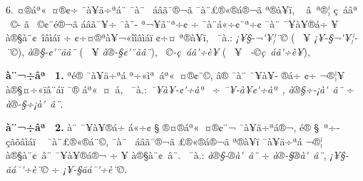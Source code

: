 \documentclass[12pt,twoside,a4paper]{article}
\newenvironment{prym}
               {\list{}{\leftmargin1.7\parindent
                        \listparindent\parindent
                        \itemindent\parindent
                        \parsep0.5ex\topsep1ex   
               }%
                        \footnotesize
                        \item\relax}
               {\endlist}
\begin{document}
6. ^^8e^^a4^^ad^^ae^^e1^^aa^^ab^^a0^^a4^^ae^^a2^^f7 ^^af^^e0^^a5^^e4^^f7^^aa^^e1^^a8 ^^af^^e0^^a8 ^^ad^^a0^^e1^^e2^^e3^^af^^ad^^ae^^ac^^e3 ^^af^^e0^^a8^^a3^^ae^^ab^^ae^^e1^^ad^^ae^^ac^^e3 \linebreak
 ^^aa^^ae^^e0^^a5^^ad^^ef, ^^a0 ^^e2^^a0^^aa^^ae^^a6 ^^e7^^a0^^e1^^e2^^aa^^a0 ^^ad^^a0^^a9- ^^e3 ^^ad^^a0^^a9^^a2^^a8^^e9^^ae^^ac^^e3 ^^e1^^e2^^e3^^af^^a5^^ad^^f7 ^^af^^e0^^a8-\linebreak
^^aa^^ac^^a5^^e2^^ad^^a8^^aa^^f7^^a2 ^^f7 ^^af^^e0^^a8^^e1^^ab^^f7^^a2^^ad^^a8^^aa^^f7^^a2 ^^af^^e0^^a8 ^^af^^a5^^e0^^a5^^ad^^ae^^e1^^f7 ^^ad^^a5 ^^e0^^ae^^a7^^e0^^a8^^a2^^a0^^ee^^e2^^ec^^e1^^ef ^^f7 \linebreak
^^a2^^f7^^a4^^ae^^aa^^e0^^a5^^ac^^ab^^ee^^ee^^e2^^ec^^e1^^ef ^^a2^^f7^^a4 ^^aa^^ae^^e0^^a5^^ad^^ef, ^^ad^^a0^^af^^e0.: 
                           \emph{^^a1^^a5^^a7-^^ac\'^^a5^^a6^^ad^^a8^^a9} (^^a0 ^^ad^^a5 \linebreak
\emph{^^a1^^a5-^^a7^^ac\'^^a5^^a6^^ad^^a8^^a9}), \emph{^^e0^^ae^^a7-^^a2\'^^a8^^ad^^e3^^e2^^a8} 
    (^^a0 ^^ad^^a5 \emph{^^e0^^ae-^^a7^^a2\'^^a8^^ad^^e3^^e2^^a8}), \emph{^^ad^^a0^^a9-^^e7^^a0^^e1^^e2\'^^f7^^e8^^a5} \linebreak
(^^a0 ^^ad^^a5 \emph{^^ad^^a0-^^a9^^e7^^a0^^e1^^e2\'^^f7^^e8^^a5}), 
\begin{prym}
\textbf{^^8f^^e0^^a8^^ac^^f7^^e2^^aa^^a0 1.} ^^9f^^aa^^e9^^ae ^^af^^e0^^a5^^e4^^f7^^aa^^e1 ^^aa^^f7^^ab^^ec^^aa^^a0^^e1^^aa^^ab^^a0^^a4^^ae^^a2^^a8^^a9, 
                                         ^^e2^^ae ^^af^^e0^^a8 ^^af^^a5^^e0^^a5-\linebreak
^^ad^^ae^^e1^^f7 ^^a2^^f7^^ad ^^ac^^ae^^a6^^a5 ^^e0^^ae^^a7^^a4^^f7^^ab^^ef^^e2^^a8^^e1^^ef ^^af^^ae ^^e1^^aa^^ab^^a0^^a4^^a0^^e5, ^^ad^^a0^^af^^e0.: 
                                \emph{^^af^^a5^^e0^^a5-^^a2\'^^f7^^e0^^aa^^a0} ^^f7 \linebreak
\emph{^^af^^a5-^^e0^^a5^^a2\'^^f7^^e0^^aa^^a0}, \emph{^^e0^^ae^^a7^^f7-^^a1^^e0\'^^a0^^e2^^a8} ^^f7 \emph{^^e0^^ae-^^a7^^f7^^a1^^e0\'^^a0^^e2^^a8}.

\textbf{^^8f^^e0^^a8^^ac^^f7^^e2^^aa^^a0 2.} ^^8f^^e0^^a8 ^^af^^a5^^e0^^a5^^ad^^ae^^e1^^f7 ^^e1^^ab^^f7^^a2 ^^a7 ^^ae^^a4^^ad^^ae^^e1^^aa^^ab^^a0^^a4^^ae^^a2^^a8^^ac 
                                           ^^af^^e0^^a5^^e4^^f7^^aa^^e1^^ae^^ac,\linebreak
^^e9^^ae ^^a7^^a0^^aa^^f7^^ad^^e7^^e3^^f5^^e2^^ec^^e1^^ef ^^ad^^a0 ^^af^^e0^^a8^^a3^^ae^^ab^^ae^^e1^^ad^^a8^^a9, ^^af^^e0^^a8 ^^ad^^a0^^e1^^e2^^e3^^af^^ad^^ae^^ac^^e3  
                                            ^^a3^^ae^^ab^^ae^^e1^^ad^^ae^^ac^^e3\linebreak 
^^aa^^ae^^e0^^a5^^ad^^ef ^^af^^e0^^a5^^e4^^f7^^aa^^e1 ^^ac^^ae^^a6^^ad^^a0 ^^e0^^ae^^a7^^e0^^a8^^a2^^a0^^e2^^a8 ^^af^^a5^^e0^^a5^^ad^^ae^^e1^^ae^^ac ^^f7 ^^ad^^a5 ^^e0^^ae^^a7^^e0^^a8^^a2^^a0^^e2^^a8.\linebreak
^^8d^^a0^^af^^e0.: 
\emph{^^e0^^ae^^a7-^^ae^^e0\'^^a0^^e2^^a8} ^^f7 \emph{^^e0^^ae-^^a7^^ae^^e0\'^^a0^^e2^^a8},
\emph{^^a1^^a5^^a7-^^e3^^e1^^af\'^^f7^^e8^^ad^^a8^^a9} ^^f7 \emph{^^a1^^a5-^^a7^^e3^^e1^^af\'^^f7^^e8^^ad^^a8^^a9}.
\end{prym}
\end{document}
